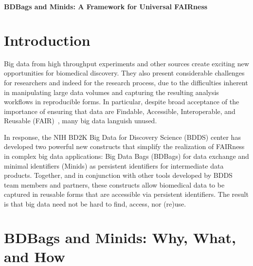 \documentclass[11pt]{article}
\begin{document}
\noindent \textbf{ \Large BDBags and Minids: A Framework for Universal FAIRness }\\


\section{Introduction}

Big data from high throughput experiments and other sources create exciting new opportunities for biomedical discovery. 
They also present considerable challenges for researchers and indeed for the research process, 
due to the difficulties inherent in manipulating large data volumes and capturing the resulting analysis workflows in reproducible forms.
In particular, despite broad acceptance of the importance of ensuring that data are
Findable, Accessible, Interoperable, and Reusable (FAIR)~\cite{wilkinson16},
many big data languish unused. 

In response, the NIH BD2K Big Data for Discovery Science (BDDS) center 
has developed two powerful new constructs that simplify the realization of FAIRness in 
complex big data applications: Big Data Bags (BDBags) for data exchange and 
minimal identifiers (Minids) as persistent identifiers for intermediate data products.
Together, and in conjunction with other tools developed by BDDS team members and partners,
these constructs allow biomedical data to be captured in reusable forms that are accessible via persistent identifiers. 
The result is that big data need not be hard to find, access, nor (re)use. 

\section{BDBags and Minids: Why, What, and How}
\end{document}
